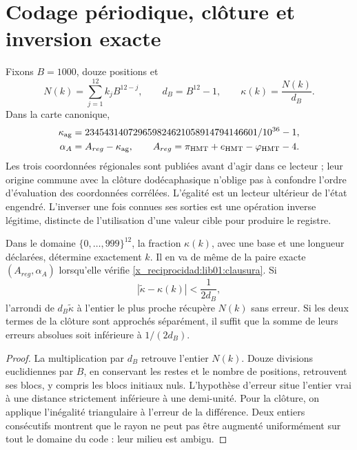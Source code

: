 \section{Codage périodique, clôture et inversion exacte}
\label{x_reciprocidad:lib01:kappa}

Fixons \(B=1000\), douze positions et
\[
 N(k)=\sum_{j=1}^{12}k_jB^{12-j},\qquad d_B=B^{12}-1,
 \qquad \kappa(k)=\frac{N(k)}{d_B}.
\]
Dans la carte canonique,
\begin{equation}
 \begin{aligned}
 \kappa_{\rm ag}
 &=\frac{234543140729659824621058914794146601}{10^{36}-1},\\
 \alpha_A&=A_{reg}-\kappa_{\rm ag},\qquad
 A_{reg}=\pi_{\rm HMT}+e_{\rm HMT}-\varphi_{\rm HMT}-4.
 \end{aligned}
 \label{x_reciprocidad:lib01:clausura}
\end{equation}
Les trois coordonnées régionales sont publiées avant d’agir dans ce lecteur ;
leur origine commune avec la clôture dodécaphasique n’oblige pas à confondre l’ordre
d’évaluation des coordonnées corrélées. L’égalité est un lecteur
ultérieur de l’état engendré. L’inverser une fois connues ses sorties est
une opération inverse légitime, distincte de l’utilisation d’une valeur cible pour
produire le registre.

\begin{proposition}
\label{x_reciprocidad:lib01:inversion-kappa}
Dans le domaine \(\{0,\ldots,999\}^{12}\), la fraction \(\kappa(k)\),
avec une base et une longueur déclarées, détermine exactement \(k\). Il en va de même
de la paire exacte \((A_{reg},\alpha_A)\) lorsqu’elle vérifie
\eqref{x_reciprocidad:lib01:clausura}. Si
\[
 |\widetilde\kappa-\kappa(k)|<\frac1{2d_B},
\]
l'arrondi de \(d_B\widetilde\kappa\) à l'entier le plus proche récupère \(N(k)\) sans erreur. Si les deux termes de la clôture sont approchés séparément, il suffit que la somme de leurs erreurs absolues soit inférieure à \(1/(2d_B)\).
\end{proposition}
\begin{proof}
La multiplication par \(d_B\) retrouve l’entier \(N(k)\).
Douze divisions euclidiennes par \(B\), en conservant les restes et le nombre
de positions, retrouvent ses blocs, y compris les blocs initiaux nuls.
L’hypothèse d’erreur situe l’entier vrai à une distance strictement
inférieure à une demi-unité. Pour la clôture, on applique l’inégalité
triangulaire à l’erreur de la différence. Deux entiers consécutifs montrent
que le rayon ne peut pas être augmenté uniformément sur tout le domaine du
code : leur milieu est ambigu.
\end{proof}

